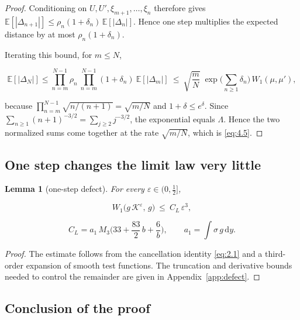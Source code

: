 \documentclass[aip,jmp,preprint,onecolumn,floatfix,superscriptaddress,nofootinbib,11pt]{revtex4-2}
\theoremstyle{plain}
\newtheorem{lemma}{Lemma}
\theoremstyle{remark}
\numberwithin{equation}{section}
\newcommand{\dd}{\mathrm{d}}
\newcommand{\E}{\mathbb{E}}
\newcommand{\eps}{\varepsilon}
\begin{document}
\begin{proof}
Conditioning on $U,U',\xi_{m+1},\dots,\xi_n$ therefore gives $\E[|\Delta_{n+1}|]\le\rho_n(1+\delta_n)\,\E[|\Delta_n|]$. Hence one step multiplies the expected distance by at most $\rho_n(1+\delta_n)$.

Iterating this bound, for $m\le N$,

\begin{equation*}
\E[|\Delta_N|]\le\prod_{n=m}^{N-1}\rho_n\ \prod_{n=m}^{N-1}(1+\delta_n)\ \E[|\Delta_m|]\ \le\ \sqrt{\frac mN}\;\exp\Big(\sum_{n\ge1}\delta_n\Big)\,W_1(\mu,\mu'),
\end{equation*}

because $\prod_{n=m}^{N-1}\sqrt{n/(n+1)}=\sqrt{m/N}$ and $1+\delta\le e^{\delta}$. Since $\sum_{n\ge1}(n+1)^{-3/2}=\sum_{j\ge2}j^{-3/2}$, the exponential equals $\Lambda$. Hence the two normalized sums come together at the rate $\sqrt{m/N}$, which is \eqref{eq:4.5}.
\end{proof}

\subsection{One step changes the limit law very little}\label{sec:4_5}

\begin{lemma}[one-step defect]

For every $\eps\in(0,\tfrac12]$,

\begin{equation}
W_1\big(g\,\mathcal K^{\eps},\,g\big)\ \le\ C_L\,\eps^{3},
\label{eq:4.6}
\end{equation}

\begin{equation}
C_L=a_1\,M_3\Big(33+\frac{83}{2}\,b+\frac6b\Big),\qquad a_1=\int\sigma\,g\,\dd y .
\label{eq:4.7}
\end{equation}

\end{lemma}

\begin{proof}
The estimate follows from the cancellation identity \eqref{eq:2.1} and a third-order expansion of smooth test functions. The truncation and derivative bounds needed to control the remainder are given in Appendix~\ref{app:defect}.
\end{proof}

\subsection{Conclusion of the proof}\label{sec:4_6}
\end{document}
